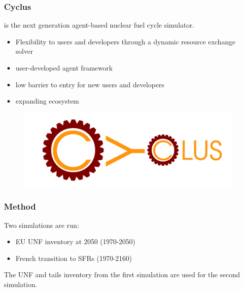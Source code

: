 \begin{frame}
	\frametitle{Cyclus}
	\Cyclus is the next generation agent-based nuclear \cite{huff_fundamental_2016}
	fuel cycle simulator.
	\begin{minipage}[b]{.45\linewidth}
	\begin{itemize}
		\item Flexibility to users and developers through a dynamic resource exchange solver
		\item user-developed agent framework
		\item low barrier to entry for new users and developers
		\item expanding ecosystem
	\end{itemize}
	\end{minipage}
	\hspace{.5cm}
	\begin{minipage}[b]{.45\linewidth}
	\begin{figure}
		\begin{center}
			\includegraphics[width=\textwidth]{./images/cyclus.png}
		\end{center}
	\end{figure}
	\end{minipage}

\end{frame}


\begin{frame}
	\frametitle{Method}
	Two simulations are run:
	\begin{itemize}
		\item \gls{EU} \gls{UNF} inventory at 2050 (1970-2050)
		\item French transition to \glspl{SFR} (1970-2160)
	\end{itemize}
	The \gls{UNF} and tails inventory from the first simulation are used for the second simulation.
\end{frame}

